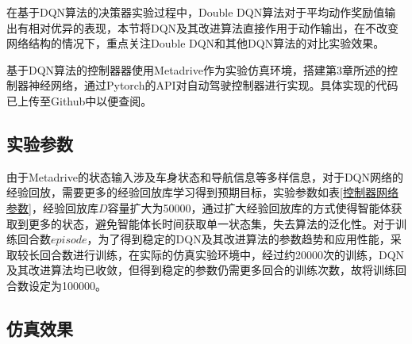 在基于DQN算法的决策器实验过程中，Double DQN算法对于平均动作奖励值输出有相对优异的表现，本节将DQN及其改进算法直接作用于动作输出，在不改变网络结构的情况下，重点关注Double DQN和其他DQN算法的对比实验效果。

基于DQN算法的控制器器使用Metadrive作为实验仿真环境，搭建第3章所述的控制器神经网络，通过Pytorch的API对自动驾驶控制器进行实现。具体实现的代码已上传至Github中以便查阅\cite{metadrive-dqn}。

\subsection{实验参数}

\begin{table}[htbp]
    \caption{控制器网络参数}\label{控制器网络参数}
    \centering
    \renewcommand\arraystretch{1.5}
\end{table}

由于Metadrive的状态输入涉及车身状态和导航信息等多样信息，对于DQN网络的经验回放，需要更多的经验回放库学习得到预期目标，实验参数如表\ref{控制器网络参数}，经验回放库$D$容量扩大为50000，通过扩大经验回放库的方式使得智能体获取到更多的状态，避免智能体长时间获取单一状态集，失去算法的泛化性。对于训练回合数$episode$，为了得到稳定的DQN及其改进算法的参数趋势和应用性能，采取较长回合数进行训练，在实际的仿真实验环境中，经过约20000次的训练，DQN及其改进算法均已收敛，但得到稳定的参数仍需更多回合的训练次数，故将训练回合数设定为100000。

\newpage

\subsection{仿真效果}

